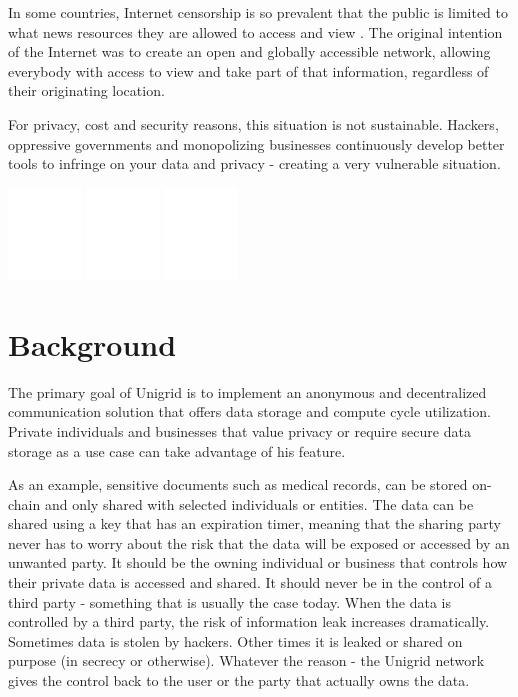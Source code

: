 \documentclass{article}
\begin{document}
In some countries, Internet censorship is so prevalent that the public is limited to what news resources they are allowed to access and view \cite{wiki2021}. The original intention of the Internet was to create an open and globally accessible network, allowing everybody with access to view and take part of that information, regardless of their originating location.

For privacy, cost and security reasons, this situation is not sustainable. Hackers, oppressive governments and monopolizing businesses continuously develop better tools to infringe on your data and privacy - creating a very vulnerable situation.

\begin{center}
\includegraphics[width=55pt]{anonymous}
\hspace{1.5cm}
\includegraphics[width=55pt]{scalability}
\hspace{1.5cm}
\includegraphics[width=55pt]{security}
\end{center}

\section{Background}
The primary goal of Unigrid is to implement an anonymous and decentralized communication solution that offers data storage and compute cycle utilization. Private individuals and businesses that value privacy or require secure data storage as a use case can take advantage of his feature.

As an example, sensitive documents such as medical records, can be stored on-chain and only shared with selected individuals or entities. The data can be shared using a key that has an expiration timer, meaning that the sharing party never has to worry about the risk that the data will be exposed or accessed by an unwanted party. It should be the owning individual or business that controls how their private data is accessed and shared. It should never be in the control of a third party - something that is usually the case today. When the data is controlled by a third party, the risk of information leak increases dramatically. Sometimes data is stolen by hackers. Other times it is leaked or shared on purpose (in secrecy or otherwise). Whatever the reason - the Unigrid network gives the control back to the user or the party that actually owns the data.
\end{document}
